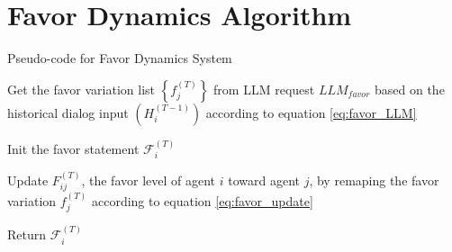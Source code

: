 \section{Favor Dynamics Algorithm}
\label{sec:Appendix_Favor_Dynamics}


\begin{algorithm*}[htbp]


    \renewcommand{\arraystretch}{1.3}
    \setlength{\tabcolsep}{10pt}
  
    \caption{Pseudo-code for Favor Dynamics System}
  
    \label{alg:FavorDynamics}
    
    Get the favor variation list $ \left\{ f_j^{(T)} \right\} $ from LLM request $ LLM_{favor} $ based on the historical dialog input $ (H_i^{(T-1)}) $ according to equation \ref{eq:favor_LLM}\label{line:FD_line1} \;
  
    Init the favor statement $ \mathcal{F}_i^{(T)} $ \;
  
     {
        
        Update $ F_{ij}^{(T)} $, the favor level of agent $ i $ toward agent $ j $, by remaping the favor variation $ f_j^{(T)} $ according to equation \ref{eq:favor_update} \; \label{lst:line:FD_line2}
  
         {
            
        }
  
    }
  
    Return $ \mathcal{F}_i^{(T)} $  
  
\end{algorithm*}


